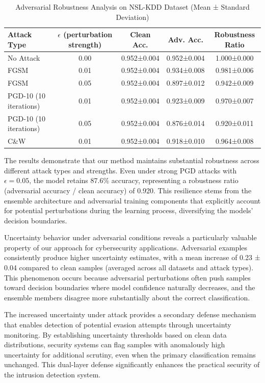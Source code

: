 \documentclass[journal]{IEEEtran}
\begin{document}
\begin{table}[t]
\centering
\caption{Adversarial Robustness Analysis on NSL-KDD Dataset (Mean ± Standard Deviation)}
\label{tab:adversarial}
\begin{tabular}{@{}lcccc@{}}
\toprule
\textbf{Attack Type} & \textbf{$\epsilon$ (perturbation strength)} & \textbf{Clean Acc.} & \textbf{Adv. Acc.} & \textbf{Robustness Ratio} \\
\midrule
No Attack & 0.00 & 0.952±0.004 & 0.952±0.004 & 1.000±0.000 \\
FGSM & 0.01 & 0.952±0.004 & 0.934±0.008 & 0.981±0.006 \\
FGSM & 0.05 & 0.952±0.004 & 0.897±0.012 & 0.942±0.009 \\
PGD-10 (10 iterations) & 0.01 & 0.952±0.004 & 0.923±0.009 & 0.970±0.007 \\
PGD-10 (10 iterations) & 0.05 & 0.952±0.004 & 0.876±0.014 & 0.920±0.011 \\
C\&W & 0.01 & 0.952±0.004 & 0.918±0.010 & 0.964±0.008 \\
\bottomrule
\end{tabular}
\end{table}

The results demonstrate that our method maintains substantial robustness across different attack types and strengths. Even under strong PGD attacks with $\epsilon = 0.05$, the model retains 87.6\% accuracy, representing a robustness ratio (adversarial accuracy / clean accuracy) of 0.920. This resilience stems from the ensemble architecture and adversarial training components that explicitly account for potential perturbations during the learning process, diversifying the models' decision boundaries.

Uncertainty behavior under adversarial conditions reveals a particularly valuable property of our approach for cybersecurity applications. Adversarial examples consistently produce higher uncertainty estimates, with a mean increase of 0.23 ± 0.04 compared to clean samples (averaged across all datasets and attack types). This phenomenon occurs because adversarial perturbations often push samples toward decision boundaries where model confidence naturally decreases, and the ensemble members disagree more substantially about the correct classification.

The increased uncertainty under attack provides a secondary defense mechanism that enables detection of potential evasion attempts through uncertainty monitoring. By establishing uncertainty thresholds based on clean data distributions, security systems can flag samples with anomalously high uncertainty for additional scrutiny, even when the primary classification remains unchanged. This dual-layer defense significantly enhances the practical security of the intrusion detection system.
\end{document}
